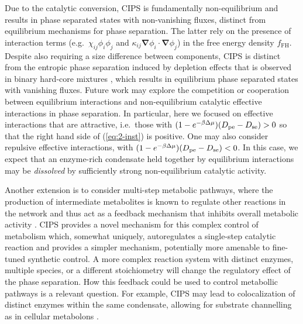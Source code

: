Due to the catalytic conversion, CIPS is fundamentally non-equilibrium and results in phase separated states with non-vanishing fluxes, distinct from equilibrium mechanisms for phase separation. The latter rely on the presence of interaction terms (e.g.~$\chi_{ij}\phi_i\phi_j$ and $\kappa_{ij}\bm{\nabla} \phi_i \cdot \bm{\nabla} \phi_j$) in the free energy density $f_\mathrm{FH}$. Despite also requiring a size difference between components, CIPS is distinct from the entropic phase separation induced by depletion effects that is observed in binary hard-core mixtures \cite{frenkel_phase_1992}, which results in equilibrium phase separated states with vanishing fluxes. Future work may explore the competition or cooperation between equilibrium interactions and non-equilibrium catalytic effective interactions in phase separation. In particular, here we focused on effective interactions that are attractive, i.e.~those with $(1-e^{-\beta \Delta \mu})(D_{\mathrm{pe}}-D_{\mathrm{se}})>0$ so that the right hand side of (\ref{eq:2-inst}) is positive. One may also consider repulsive effective interactions, with $(1-e^{-\beta \Delta \mu})(D_{\mathrm{pe}}-D_{\mathrm{se}})<0$. In this case, we expect that an enzyme-rich condensate held together by equilibrium interactions may be {\it dissolved} by sufficiently strong non-equilibrium catalytic activity.

Another extension is to consider multi-step metabolic pathways, where the production of intermediate metabolites is known to regulate other reactions in the network and thus act as a feedback mechanism that inhibits overall metabolic activity \cite{oconnell_dynamic_2012,alam_self-inhibitory_2017}. CIPS provides a novel mechanism for this complex control of metabolism which, somewhat uniquely, autoregulates a single-step catalytic reaction and provides a simpler mechanism, potentially more amenable to fine-tuned synthetic control. A more complex reaction system with distinct enzymes, multiple species, or a different stoichiometry will change the regulatory effect of the phase separation. How this feedback could be used to control metabollic pathways is a relevant question. For example, CIPS may lead to colocalization of distinct enzymes within the same condensate, allowing for substrate channelling as in cellular metabolons \cite{poshyvailo_does_2017, sweetlove_role_2018}.


